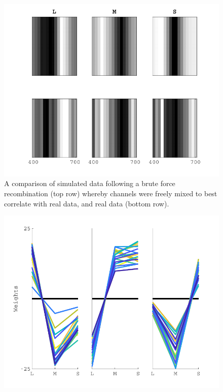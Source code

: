 \begin{figure}[htbp]
\includegraphics[max width=\textwidth]{figs/LargeSphere/maxsimVreal.pdf}
\caption{A comparison of simulated data following a brute force recombination (top row) whereby channels were freely mixed to best correlate with real data, and real data (bottom row).}
\label{fig:maxsimVreal}
\end{figure}

\begin{figure}[htbp]
\includegraphics[max width=\textwidth]{figs/LargeSphere/contributions.pdf}
\caption{}
\label{fig:contributions}
\end{figure}

